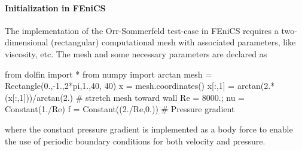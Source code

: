 \paragraph{Initialization in FEniCS}

The implementation of the Orr-Sommerfeld test-case in FEniCS requires a two-dimensional (rectangular) computational mesh with associated parameters, like viscosity, etc. The  mesh and some necessary parameters are declared as
\begin{python}
    from dolfin import *
    from numpy import arctan
    mesh = Rectangle(0.,-1.,2*pi,1.,40, 40)
    x = mesh.coordinates()
    x[:,1] = arctan(2.*(x[:,1]))/arctan(2.)  # stretch mesh toward wall
    Re = 8000.; nu = Constant(1./Re)
    f = Constant((2./Re,0.)) # Pressure gradient
\end{python}
where the constant pressure gradient is implemented as a body force to enable the use of periodic boundary conditions for both velocity and pressure. 

